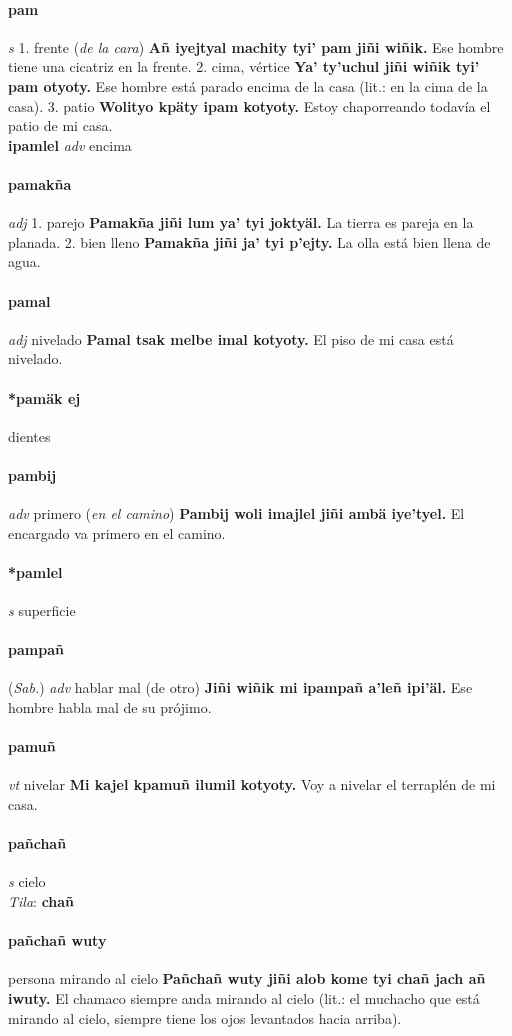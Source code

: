 \documentclass{scrbook}
\newcommand{\entry}[1]{\paragraph{#1}}
\newcommand{\onedefinition}[1]{#1.}
\newcommand{\partofspeech}[1]{\textit{#1}}
\newcommand{\spanishtranslation}[1]{#1}
\newcommand{\clarification}[1]{(\textit{#1})}
\newcommand{\cholexample}[1]{\textbf{#1}}
\newcommand{\exampletranslation}[1]{#1}
\newcommand{\dialectvariant}[1]{\\\textit{#1}:}
\newcommand{\dialectword}[1]{\textbf{#1}}
\newcommand{\relevantdialect}[1]{(\textit{#1})}
\newcommand{\secondaryentry}[1]{\\\textbf{#1}}
\newcommand{\secondpartofspeech}[1]{\textit{#1}}
\newcommand{\secondtranslation}[1]{#1}
\begin{document}
\begin{multicols}{2}
\entry{pam}
\partofspeech{s}
\onedefinition{1}
\spanishtranslation{frente}
\clarification{de la cara}
\cholexample{Añ iyejtyal machity tyi' pam jiñi wiñik.}
\exampletranslation{Ese hombre tiene una cicatriz en la frente.}
\onedefinition{2}
\spanishtranslation{cima, vértice}
\cholexample{Ya' ty'uchul jiñi wiñik tyi' pam otyoty.}
\exampletranslation{Ese hombre está parado encima de la casa (lit.: en la cima de la casa).}
\onedefinition{3}
\spanishtranslation{patio}
\cholexample{Wolityo kpäty ipam kotyoty.}
\exampletranslation{Estoy chaporreando todavía el patio de mi casa.}
\secondaryentry{ipamlel}
\secondpartofspeech{adv}
\secondtranslation{encima}

\entry{pamakña}
\partofspeech{adj}
\onedefinition{1}
\spanishtranslation{parejo}
\cholexample{Pamakña jiñi lum ya' tyi joktyäl.}
\exampletranslation{La tierra es pareja en la planada.}
\onedefinition{2}
\spanishtranslation{bien lleno}
\cholexample{Pamakña jiñi ja' tyi p'ejty.}
\exampletranslation{La olla está bien llena de agua.}

\entry{pamal}
\partofspeech{adj}
\spanishtranslation{nivelado}
\cholexample{Pamal tsak melbe imal kotyoty.}
\exampletranslation{El piso de mi casa está nivelado.}

\entry{*pamäk ej}
\spanishtranslation{dientes}

\entry{pambij}
\partofspeech{adv}
\spanishtranslation{primero}
\clarification{en el camino}
\cholexample{Pambij woli imajlel jiñi ambä iye'tyel.}
\exampletranslation{El encargado va primero en el camino.}

\entry{*pamlel}
\partofspeech{s}
\spanishtranslation{superficie}

\entry{pampañ}
\relevantdialect{Sab.}
\partofspeech{adv}
\spanishtranslation{hablar mal (de otro)}
\cholexample{Jiñi wiñik mi ipampañ a'leñ ipi'äl.}
\exampletranslation{Ese hombre habla mal de su prójimo.}

\entry{pamuñ}
\partofspeech{vt}
\spanishtranslation{nivelar}
\cholexample{Mi kajel kpamuñ ilumil kotyoty.}
\exampletranslation{Voy a nivelar el terraplén de mi casa.}

\entry{pañchañ}
\partofspeech{s}
\spanishtranslation{cielo}
\dialectvariant{Tila}
\dialectword{chañ}

\entry{pañchañ wuty}
\spanishtranslation{persona mirando al cielo}
\cholexample{Pañchañ wuty jiñi alob kome tyi chañ jach añ iwuty.}
\exampletranslation{El chamaco siempre anda mirando al cielo (lit.: el muchacho que está mirando al cielo, siempre tiene los ojos levantados hacia arriba).}


\end{multicols}
\end{document}
